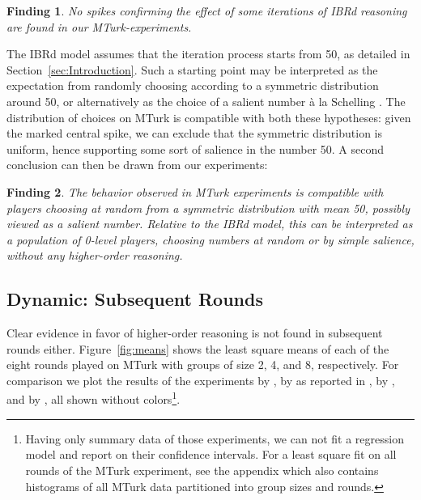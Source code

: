 \documentclass[12pt,review]{elsarticle}
\newtheorem{fdn}{Finding}
\begin{document}
\begin{fdn}
No spikes confirming the effect of some iterations of IBRd reasoning are found in our MTurk-experiments.
\end{fdn}

The IBRd model assumes that the iteration process starts from 50, as detailed in Section~\ref{sec:Introduction}. Such a starting point may be interpreted as the expectation from randomly choosing according to a symmetric distribution around 50, or alternatively as the choice of a salient number \`{a} la Schelling \citep{sch60}. The distribution of choices on MTurk is compatible with both these hypotheses: given the marked central spike, we can exclude that the symmetric distribution is uniform, hence supporting some sort of salience in the number 50. A second conclusion can then be drawn from our experiments: 

\begin{fdn}
The behavior observed in MTurk experiments is compatible with players choosing at random from a symmetric distribution with mean 50, possibly viewed as a salient number. Relative to the IBRd model, this can be interpreted as a population of 0-level players, choosing numbers at random or by simple salience, without any higher-order reasoning.
\end{fdn}

\subsection{Dynamic: Subsequent Rounds\label{subsec:Dynamic:-Subsequent-Rounds}}
\noindent
Clear evidence in favor of higher-order reasoning is not found in subsequent rounds either. Figure~\ref{fig:means} shows the least square means of each of the eight rounds played on MTurk with groups of size 2, 4, and 8, respectively. For comparison we plot the results of the experiments by \citet{Nagel95}, by \citet{Kamm2008unter} as reported in \cite{diekmann2009rational}, by \citet{weber2003learning}, and by \citet{buhren2010chess}, all shown without colors\footnote{Having only summary data of those experiments, we can not fit a regression model and report on their confidence intervals. For a least square fit on all rounds of the MTurk experiment, see the appendix which also contains histograms of all MTurk data partitioned into group sizes and rounds.}. 
\end{document}
